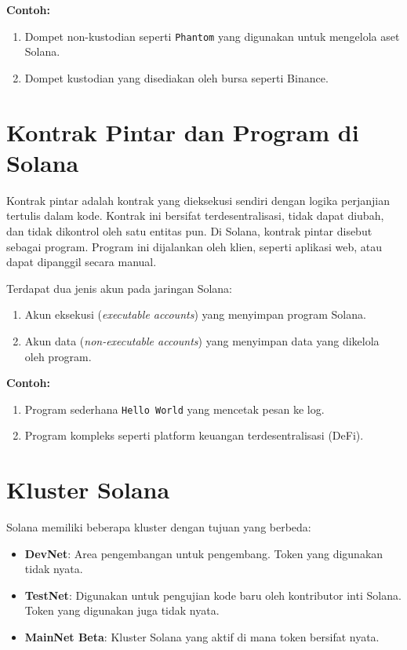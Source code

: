 \textbf{Contoh:}
\begin{enumerate}
	\item Dompet non-kustodian seperti \texttt{Phantom} yang digunakan untuk mengelola aset Solana.
	\item Dompet kustodian yang disediakan oleh bursa seperti Binance.
\end{enumerate}

\section{Kontrak Pintar dan Program di Solana}

Kontrak pintar adalah kontrak yang dieksekusi sendiri dengan logika perjanjian tertulis dalam kode. Kontrak ini bersifat terdesentralisasi, tidak dapat diubah, dan tidak dikontrol oleh satu entitas pun. Di Solana, kontrak pintar disebut sebagai program. Program ini dijalankan oleh klien, seperti aplikasi web, atau dapat dipanggil secara manual. 

Terdapat dua jenis akun pada jaringan Solana:
\begin{enumerate}
	\item Akun eksekusi (\textit{executable accounts}) yang menyimpan program Solana.
	\item Akun data (\textit{non-executable accounts}) yang menyimpan data yang dikelola oleh program.
\end{enumerate}

\textbf{Contoh:}
\begin{enumerate}
	\item Program sederhana \texttt{Hello World} yang mencetak pesan ke log.
	\item Program kompleks seperti platform keuangan terdesentralisasi (DeFi).
\end{enumerate}

\section{Kluster Solana}

Solana memiliki beberapa kluster dengan tujuan yang berbeda:
\begin{itemize}
	\item \textbf{DevNet}: Area pengembangan untuk pengembang. Token yang digunakan tidak nyata.
	\item \textbf{TestNet}: Digunakan untuk pengujian kode baru oleh kontributor inti Solana. Token yang digunakan juga tidak nyata.
	\item \textbf{MainNet Beta}: Kluster Solana yang aktif di mana token bersifat nyata.
\end{itemize}

